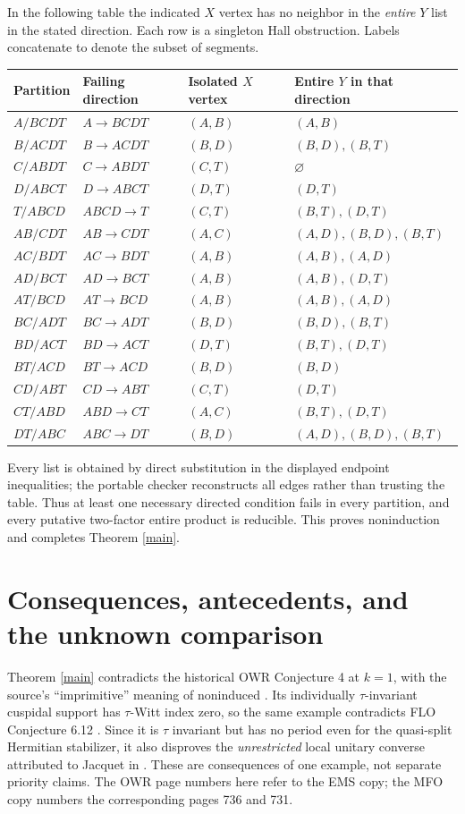 \documentclass[11pt]{article}
\begin{document}
In the following table the indicated $X$ vertex has no neighbor in the \emph{entire} $Y$ list in the stated direction. Each row is a singleton Hall obstruction. Labels concatenate to denote the subset of segments.
\begin{center}\small
\begin{tabular}{llll}
\toprule
Partition & Failing direction & Isolated $X$ vertex & Entire $Y$ in that direction\\
\midrule
$A/BCDT$ & $A\to BCDT$ & $(A,B)$ & $(A,B)$\\
$B/ACDT$ & $B\to ACDT$ & $(B,D)$ & $(B,D),(B,T)$\\
$C/ABDT$ & $C\to ABDT$ & $(C,T)$ & $\varnothing$\\
$D/ABCT$ & $D\to ABCT$ & $(D,T)$ & $(D,T)$\\
$T/ABCD$ & $ABCD\to T$ & $(C,T)$ & $(B,T),(D,T)$\\
$AB/CDT$ & $AB\to CDT$ & $(A,C)$ & $(A,D),(B,D),(B,T)$\\
$AC/BDT$ & $AC\to BDT$ & $(A,B)$ & $(A,B),(A,D)$\\
$AD/BCT$ & $AD\to BCT$ & $(A,B)$ & $(A,B),(D,T)$\\
$AT/BCD$ & $AT\to BCD$ & $(A,B)$ & $(A,B),(A,D)$\\
$BC/ADT$ & $BC\to ADT$ & $(B,D)$ & $(B,D),(B,T)$\\
$BD/ACT$ & $BD\to ACT$ & $(D,T)$ & $(B,T),(D,T)$\\
$BT/ACD$ & $BT\to ACD$ & $(B,D)$ & $(B,D)$\\
$CD/ABT$ & $CD\to ABT$ & $(C,T)$ & $(D,T)$\\
$CT/ABD$ & $ABD\to CT$ & $(A,C)$ & $(B,T),(D,T)$\\
$DT/ABC$ & $ABC\to DT$ & $(B,D)$ & $(A,D),(B,D),(B,T)$\\
\bottomrule
\end{tabular}
\end{center}
Every list is obtained by direct substitution in the displayed endpoint inequalities; the portable checker reconstructs all edges rather than trusting the table. Thus at least one necessary directed condition fails in every partition, and every putative two-factor entire product is reducible. This proves noninduction and completes Theorem \ref{main}.

\section{Consequences, antecedents, and the unknown comparison}
Theorem \ref{main} contradicts the historical OWR Conjecture 4 at $k=1$, with the source's ``imprimitive'' meaning of noninduced \cite[p.734]{OWR}. Its individually $\tau$-invariant cuspidal support has $\tau$-Witt index zero, so the same example contradicts FLO Conjecture 6.12 \cite[p.246]{FLO}. Since it is $\tau$ invariant but has no period even for the quasi-split Hermitian stabilizer, it also disproves the \emph{unrestricted} local unitary converse attributed to Jacquet in \cite[Conjecture 1, p.729]{OWR}. These are consequences of one example, not separate priority claims. The OWR page numbers here refer to the EMS copy; the MFO copy numbers the corresponding pages 736 and 731.
\end{document}
